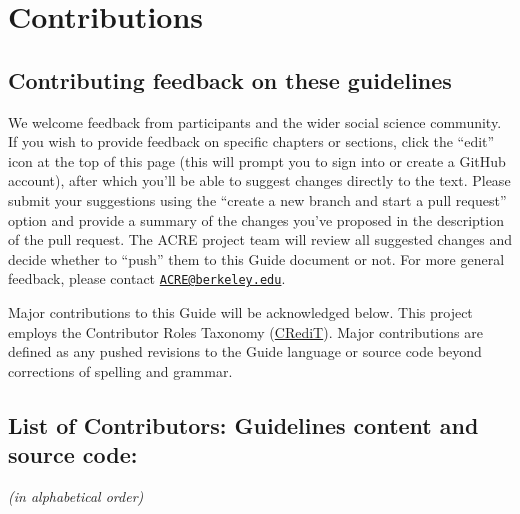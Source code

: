\documentclass[]{book}
\begin{document}
\hypertarget{contributions}{%
\chapter{Contributions}\label{contributions}}

\hypertarget{contrib-guide}{%
\section{Contributing feedback on these guidelines}\label{contrib-guide}}

We welcome feedback from participants and the wider social science community. If you wish to provide feedback on specific chapters or sections, click the ``edit'' icon at the top of this page (this will prompt you to sign into or create a GitHub account), after which you'll be able to suggest changes directly to the text. Please submit your suggestions using the ``create a new branch and start a pull request'' option and provide a summary of the changes you've proposed in the description of the pull request. The ACRE project team will review all suggested changes and decide whether to ``push'' them to this Guide document or not. For more general feedback, please contact \href{mailto:ACRE@berkeley.edu}{\nolinkurl{ACRE@berkeley.edu}}.

Major contributions to this Guide will be acknowledged below. This project employs the Contributor Roles Taxonomy (\href{https://casrai.org/credit/}{CRediT}). Major contributions are defined as any pushed revisions to the Guide language or source code beyond corrections of spelling and grammar.

\hypertarget{list-of-contributors-guidelines-content-and-source-code}{%
\section{List of Contributors: Guidelines content and source code:}\label{list-of-contributors-guidelines-content-and-source-code}}

\emph{(in alphabetical order)}
\end{document}
